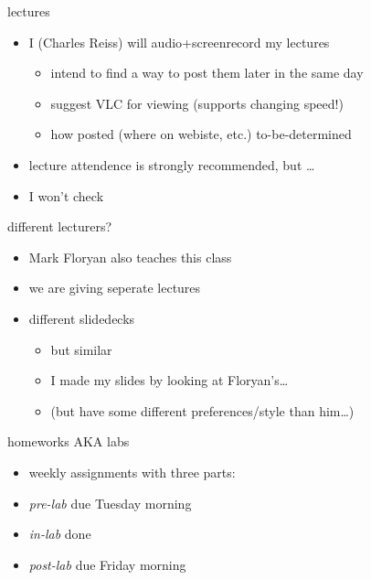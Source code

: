 \begin{frame}{lectures}
    \begin{itemize}
    \item I (Charles Reiss) will audio+screenrecord my lectures
        \begin{itemize}
        \item intend to find a way to post them later in the same day
        \item suggest VLC for viewing (supports changing speed!)
        \item how posted (where on webiste, etc.) to-be-determined
        \end{itemize}
    \item lecture attendence is strongly recommended, but \ldots
    \item I won't check
    \end{itemize}
\end{frame}

\begin{frame}{different lecturers?}
    \begin{itemize}
    \item Mark Floryan also teaches this class
    \item we are giving seperate lectures
    \item different slidedecks
        \begin{itemize}
        \item but similar
        \item I made my slides by looking at Floryan's\ldots
        \item (but have some different preferences/style than him\ldots)
        \end{itemize}
    \end{itemize}
\end{frame}

\begin{frame}{homeworks AKA labs}
    \begin{itemize}
    \item weekly assignments with three parts:
    \vspace{.5cm}
    \item \textit{pre-lab} due Tuesday morning
    \item \textit{in-lab} done 
    \item \textit{post-lab} due Friday morning
    \end{itemize}
\end{frame}

